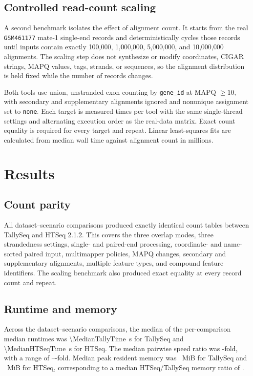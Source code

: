 \documentclass[11pt]{article}
\begin{document}
\subsection{Controlled read-count scaling}

A second benchmark isolates the effect of alignment count. It starts from the real \texttt{GSM461177} mate-1 single-end records and deterministically cycles those records until inputs contain exactly 100,000, 1,000,000, 5,000,000, and 10,000,000 alignments. The scaling step does not synthesize or modify coordinates, CIGAR strings, MAPQ values, tags, strands, or sequences, so the alignment distribution is held fixed while the number of records changes.

Both tools use union, unstranded exon counting by \texttt{gene\_id} at MAPQ $\geq 10$, with secondary and supplementary alignments ignored and nonunique assignment set to \texttt{none}. Each target is measured \ScalingRepeats{} times per tool with the same single-thread settings and alternating execution order as the real-data matrix. Exact count equality is required for every target and repeat. Linear least-squares fits are calculated from median wall time against alignment count in millions.

\section{Results}

\subsection{Count parity}

All \BenchmarkDatasetScenarioCount{} dataset--scenario comparisons produced exactly identical count tables between TallySeq and HTSeq 2.1.2. This covers the three overlap modes, three strandedness settings, single- and paired-end processing, coordinate- and name-sorted paired input, multimapper policies, MAPQ changes, secondary and supplementary alignments, multiple feature types, and compound feature identifiers. The scaling benchmark also produced exact equality at every record count and repeat.

\subsection{Runtime and memory}

Across the \BenchmarkDatasetScenarioCount{} dataset--scenario comparisons, the median of the per-comparison median runtimes was \SI{\MedianTallyTime}{\second} for TallySeq and \SI{\MedianHTSeqTime}{\second} for HTSeq. The median pairwise speed ratio was \MedianSpeedup{}-fold, with a range of \MinimumSpeedup{}--\MaximumSpeedup{}-fold. Median peak resident memory was \MedianTallyRSS{}~MiB for TallySeq and \MedianHTSeqRSS{}~MiB for HTSeq, corresponding to a median HTSeq/TallySeq memory ratio of \MedianMemoryRatio{}.
\end{document}
